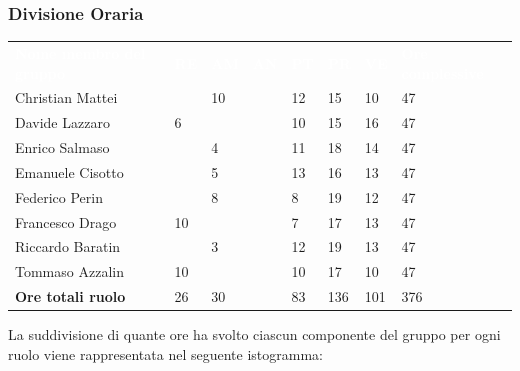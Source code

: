 \subsubsection{Divisione Oraria}
{
	\renewcommand{\arraystretch}{2}
	\centering
	\begin{longtable}{ C{5cm} C{1cm} C{1cm} C{1cm} C{1cm} C{1cm} C{1cm} C{3cm}}
		\textcolor{white}{\textbf{Nome membro del gruppo}} & \textcolor{white}{\textbf{RE}} & \textcolor{white}{\textbf{AM}} & \textcolor{white}{\textbf{AN}} & \textcolor{white}{\textbf{PT}} & \textcolor{white}{\textbf{PR}} & \textcolor{white}{\textbf{VE}} & \textcolor{white}{\textbf{Ore complessive}}\\	
        
        Christian Mattei & & 10 & & 12 & 15 & 10 & 47\\
        Davide Lazzaro & 6 & & & 10 & 15 & 16 & 47\\
        Enrico Salmaso & & 4 & & 11 & 18 & 14 & 47\\
        Emanuele Cisotto & & 5 & & 13 & 16 & 13 & 47 \\
        Federico Perin & & 8 & & 8 & 19 & 12 & 47\\
        Francesco Drago & 10 & & & 7 & 17 & 13 & 47\\
        Riccardo Baratin & & 3 & & 12 & 19 & 13 & 47\\
        Tommaso Azzalin & 10 & & & 10 & 17 & 10 & 47 \\
        \textbf{Ore totali ruolo} & 26 & 30 & & 83 & 136 & 101 & 376\\
		
	\end{longtable}
}

La suddivisione di quante ore ha svolto ciascun componente del gruppo per ogni ruolo viene rappresentata nel seguente istogramma:

\begin{figure}[h]
\end{figure}

